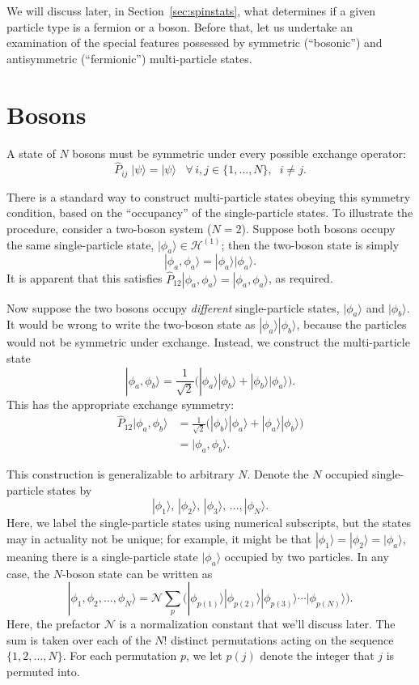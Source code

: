 \documentclass[pra,12pt]{revtex4}
\begin{document}
We will discuss later, in Section~\ref{sec:spinstats}, what determines
if a given particle type is a fermion or a boson.  Before that, let us
undertake an examination of the special features possessed by
symmetric (``bosonic'') and antisymmetric (``fermionic'')
multi-particle states.

\section{Bosons}

A state of $N$ bosons must be symmetric under every possible exchange
operator:
$$\hat{P}_{ij}\; |\psi\rangle = |\psi\rangle \;\;\; \forall\, i, j \in\{1,\dots,N\},\;\; i\ne j.$$

There is a standard way to construct multi-particle states obeying
this symmetry condition, based on the ``occupancy'' of the
single-particle states.  To illustrate the procedure, consider a
two-boson system ($N = 2$).  Suppose both bosons occupy the same
single-particle state, $|\phi_a\rangle \in \mathscr{H}^{(1)}$; then
the two-boson state is simply
$$|\phi_a,\phi_a\rangle = |\phi_a\rangle  |\phi_a\rangle.$$
It is apparent that this satisfies $\hat{P}_{12}
|\phi_a,\phi_a\rangle = |\phi_a,\phi_a\rangle$, as required.

Now suppose the two bosons occupy \textit{different} single-particle
states, $|\phi_a\rangle$ and $|\phi_b\rangle$.  It would be wrong to
write the two-boson state as $|\phi_a\rangle |\phi_b\rangle$, because
the particles would not be symmetric under exchange.  Instead, we
construct the multi-particle state
$$|\phi_a,\phi_b\rangle = \frac{1}{\sqrt{2}} \Big( |\phi_a\rangle  |\phi_b\rangle + |\phi_b\rangle  |\phi_a\rangle\Big).$$
This has the appropriate exchange symmetry:
$$\begin{aligned}\hat{P}_{12}|\phi_a,\phi_b\rangle &= \frac{1}{\sqrt{2}} \Big( |\phi_b\rangle  |\phi_a\rangle + |\phi_a\rangle  |\phi_b\rangle\Big) \\ &= |\phi_a,\phi_b\rangle.\end{aligned}$$

This construction is generalizable to arbitrary $N$.  Denote the $N$
occupied single-particle states by
$$|\phi_1\rangle, \, |\phi_2\rangle, \, |\phi_3\rangle, \, \dots, |\phi_N\rangle.$$
Here, we label the single-particle states using numerical subscripts,
but the states may in actuality not be unique; for example, it might
be that $|\phi_1\rangle = |\phi_2\rangle = |\phi_a\rangle$, meaning
there is a single-particle state $|\phi_a\rangle$ occupied by two
particles.  In any case, the $N$-boson state can be written as
$$|\phi_1,\phi_2,\dots,\phi_N\rangle = \mathcal{N} \sum_p \Big(|\phi_{p(1)}\rangle  |\phi_{p(2)}\rangle  |\phi_{p(3)}\rangle  \cdots  |\phi_{p(N)}\rangle\Big).$$
Here, the prefactor $\mathcal{N}$ is a normalization constant that
we'll discuss later.  The sum is taken over each of the $N!$ distinct
permutations acting on the sequence $\{1,2,\dots,N\}$.  For each
permutation $p$, we let $p(j)$ denote the integer that $j$ is permuted
into.
\end{document}
